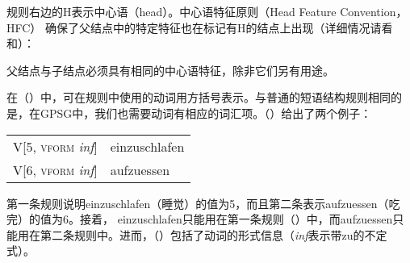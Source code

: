 规则右边的H表示中心语（head）。中心语特征原则（Head Feature Convention，HFC） 确保了父结点中的特定特征也在标记有H的结点上出现（详细情况请看\citealp*[\S~5.4]{GKPS85a}和\citealp[67]{Uszkoreit87a}）：
\begin{principle-break}
父结点与子结点必须具有相同的中心语特征，除非它们另有用途。
\end{principle-break}
%
在（）中，可在规则中使用的动词用方括号表示。与普通的短语结构规则相同的是，在GPSG中，我们也需要动词有相应的词汇项。（）给出了两个例子：
\ea
\begin{tabular}[t]{@{}l@{~$\to$~}l@{}}
V[5, \textsc{vform} \emph{inf}]  & einzuschlafen\\
V[6, \textsc{vform} \emph{inf}]  & aufzuessen\\
\end{tabular}
\z
第一条规则说明einzuschlafen（睡觉）的\subcatc 值为5，而且第二条表示aufzuessen（吃完）的\subcatc 值为6。接着， einzuschlafen只能用在第一条规则（）中，而aufzuessen只能用在第二条规则中。进而，（）包括了动词的形式信息（\emph{inf}表示带zu的不定式）。

